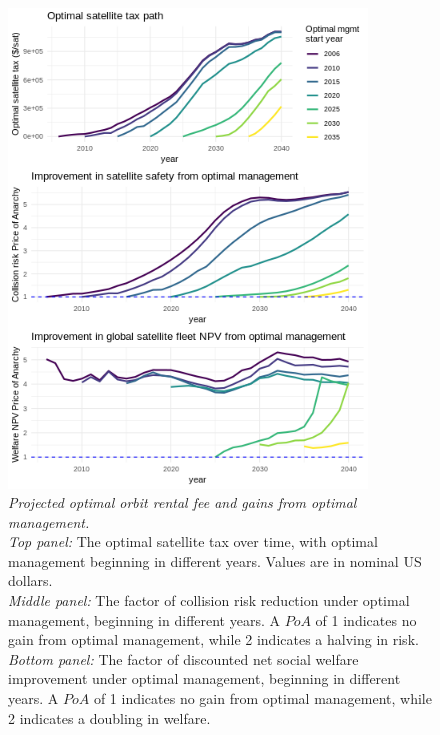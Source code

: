 \documentclass[12pt]{article}
\begin{document}
\begin{figure}[H]
	\centering
	\includegraphics[width=0.85\textwidth]{../../images/manystarts_welfare_and_tax_optstart_2006_remfrac_0_remstart_2025.png}	
	\captionsetup{format=hang}
	\caption[Projected optimal orbit rental fee and gains from optimal management]{\textit{Projected optimal orbit rental fee and gains from optimal management.} \\
		\textit{Top panel:} The optimal satellite tax over time, with optimal management beginning in different years. Values are in nominal US dollars. \\
		\textit{Middle panel:} The factor of collision risk reduction under optimal management, beginning in different years. A $PoA$ of 1 indicates no gain from optimal management, while 2 indicates a halving in risk. \\
		\textit{Bottom panel:} The factor of discounted net social welfare improvement under optimal management, beginning in different years. A $PoA$ of 1 indicates no gain from optimal management, while 2 indicates a doubling in welfare. \\
	}
	\label{projected_tax_path}
\end{figure}
\end{document}
